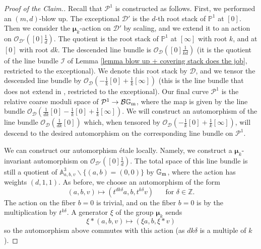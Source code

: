 \documentclass{amsart}
\newcommand{\bA}{\mathbb{A}}
\newcommand{\bG}{\mathbb{G}}
\newcommand{\bP}{\mathbb{P}}
\newcommand{\bZ}{\mathbb{Z}}
\newcommand{\cB}{\mathcal{B}}
\newcommand{\cD}{\mathcal{D}}
\newcommand{\cI}{\mathcal{I}}
\newcommand{\cO}{\mathcal{O}}
\newcommand{\cP}{\mathcal{P}}
\newcommand{\Gm}{\bG_{{\rm m}}}
\newcommand{\bmu}{\bm{\mu}}
\theoremstyle{definition}
\begin{document}
\begin{proof}[Proof of the Claim.]
Recall that $\cP^1$ is constructed as follows. First, we performed an $(m,d)$-blow up. The exceptional $\cD'$ is the $d$-th root stack of $\bP^1$ at $[0]$. Then we consider the $\bmu_k$-action on $\cD'$ by scaling, and we extend it to an action on $\cO_{\cD'}([0] \frac{1}{d})$.
The quotient is the root stack of $\bP^1$ at $[\infty]$ with root $k$, and at $[0]$ with root $dk$. The descended line bundle is $\cO_{\cD}([0] \frac{1}{kd})$ (it is the quotient of the line bundle $\cI$ of Lemma \ref{lemma blow up + covering stack does the job}, restricted to the exceptional). We denote this root stack by $\cD$, and we tensor the descended line bundle by $\cO_\cD(-\frac{1}{k}[0] + \frac{1}{k}[\infty])$ (this is the line bundle that does not extend in , restricted to the exceptional). Our final curve $\cP^1$ is the relative coarse moduli space of $\cP^1\to \cB\Gm$, where the map is given by the line bundle $\cO_\cD(\frac{1}{dk}[0] -\frac{1}{k}[0] + \frac{1}{k}[\infty])$. We will construct an automorphism of the line bundle $\cO_\cD(\frac{1}{dk}[0])$ which, when tensored by $\cO_\cD(-\frac{1}{k}[0] + \frac{1}{k}[\infty])$, will descend to the desired automorphism on the corresponding line bundle on $\cP^1$.

We can construct our automorphism \'etale locally. Namely, we construct a $\bmu_k$-invariant automorphism on $\cO_{\cD'}([0] \frac{1}{d})$. The total space of this line bundle is still a quotient of $\bA^3_{a,b,v}\smallsetminus \{(a,b)=(0,0)\}$ by $\Gm$, where the action has weights $(d,1,1)$. As before, we choose an automorphism of the form 
$$(a,b,v)\mapsto (t^{dk\delta}a, b, t^{k\delta}v) \text{ }\text{ }\text{ for }\delta \in \bZ.$$
The action on the fiber $b=0$ is trivial, and on the fiber $b=0$ is by the multiplication by $t^{k\delta}$. A generator $\xi$ of the group $\bmu_k$ sends $$\xi*(a,b,v)\mapsto (\xi a,b, \xi *v)$$
so the automorphism above commutes with this action (as $dk\delta$ is a multiple of $k$). 
\end{proof}







\end{document}
